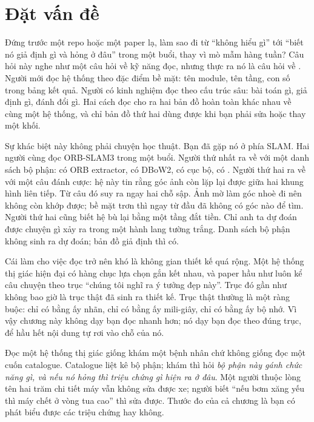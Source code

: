 \documentclass[../../deep_learning.tex]{subfiles}
\begin{document}
\section{Đặt vấn đề}
Đứng trước một repo hoặc một paper lạ, làm sao đi từ ``không hiểu gì'' tới ``biết nó giả định gì và hỏng ở đâu'' trong một buổi, thay vì mò mẫm hàng tuần? Câu hỏi này nghe như một câu hỏi về kỹ năng đọc, nhưng thực ra nó là câu hỏi về . Người mới đọc hệ thống theo đặc điểm bề mặt: tên module, tên tầng, con số trong bảng kết quả. Người có kinh nghiệm đọc theo cấu trúc sâu: bài toán gì, giả định gì, đánh đổi gì. Hai cách đọc cho ra hai bản đồ hoàn toàn khác nhau về cùng một hệ thống, và chỉ bản đồ thứ hai dùng được khi bạn phải sửa hoặc thay một khối.

Sự khác biệt này không phải chuyện học thuật. Bạn đã gặp nó ở phía SLAM. Hai người cùng đọc ORB-SLAM3 \cite{campos2021orbslam3} trong một buổi. Người thứ nhất ra về với một danh sách bộ phận: có ORB extractor, có DBoW2, có  cục bộ, có . Người thứ hai ra về với một câu đánh cược: hệ này tin rằng góc ảnh còn lặp lại được giữa hai khung hình liên tiếp. Từ câu đó suy ra ngay hai chỗ sập. Ảnh mờ làm góc nhoè đi nên không còn khớp được; bề mặt trơn thì ngay từ đầu đã không có góc nào để tìm. Người thứ hai cũng biết hệ bù lại bằng một tầng  đắt tiền. Chỉ anh ta dự đoán được chuyện gì xảy ra trong một hành lang tường trắng. Danh sách bộ phận không sinh ra dự đoán; bản đồ giả định thì có.

Cái làm cho việc đọc trở nên khó là không gian thiết kế quá rộng. Một hệ thống thị giác hiện đại có hàng chục lựa chọn gắn kết nhau, và paper hầu như luôn kể câu chuyện theo trục ``chúng tôi nghĩ ra ý tưởng đẹp này''. Trục đó gần như không bao giờ là trục thật đã sinh ra thiết kế. Trục thật thường là một ràng buộc: chỉ có bằng ấy nhãn, chỉ có bằng ấy mili-giây, chỉ có bằng ấy bộ nhớ. Vì vậy chương này không dạy bạn đọc nhanh hơn; nó dạy bạn đọc theo đúng trục, để hầu hết nội dung tự rơi vào chỗ của nó.

\begin{trucgiac}
Đọc một hệ thống thị giác giống khám một bệnh nhân chứ không giống đọc một cuốn catalogue. Catalogue liệt kê bộ phận; khám thì hỏi \emph{bộ phận này gánh chức năng gì, và nếu nó hỏng thì triệu chứng gì hiện ra ở đâu}. Một người thuộc lòng tên hai trăm chi tiết máy vẫn không sửa được xe; người biết ``nếu bơm xăng yếu thì máy chết ở vòng tua cao'' thì sửa được. Thước đo của cả chương là bạn có phát biểu được các triệu chứng hay không.
\end{trucgiac}
\end{document}
